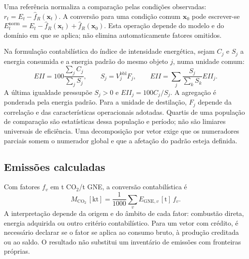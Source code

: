 Uma referência normaliza a comparação pelas condições observadas: $r_t=E_t-\widehat f_R(\boldsymbol x_t)$. A conversão para uma condição comum $\boldsymbol x_0$ pode escrever-se $E_t^{\mathrm{norm}}=E_t-\widehat f_R(\boldsymbol x_t)+\widehat f_R(\boldsymbol x_0)$. Esta operação depende do modelo e do domínio em que se aplica; não elimina automaticamente fatores omitidos.

Na formulação contabilística do índice de intensidade energética, sejam $C_j$ e $S_j$ a energia consumida e a energia padrão do mesmo objeto $j$, numa unidade comum:
\begin{equation}
EII=100\frac{\sum_jC_j}{\sum_jS_j},
\qquad S_j=V_j^{\mathrm{bbl}}F_j,
\qquad EII=\sum_j\frac{S_j}{\sum_kS_k}EII_j.
\label{eq:mat-eii}
\end{equation}
A última igualdade pressupõe $S_j>0$ e $EII_j=100C_j/S_j$. A agregação é ponderada pela energia padrão. Para a unidade de destilação, $F_j$ depende da correlação e das características operacionais adotadas. Quartis de uma população de comparação são estatísticas dessa população e período; não são limiares universais de eficiência. Uma decomposição por vetor exige que os numeradores parciais somem o numerador global e que a afetação do padrão esteja definida.


\subsection{Emissões calculadas}
\label{sec:mat-emissoes}
Com fatores $f_v$ em t CO$_2$/t GNE, a
conversão contabilística é
\begin{equation}
M_{\mathrm{CO_2}}\,[\mathrm{kt}]=\frac1{1000}\sum_v E_{\mathrm{GNE},v}\,[\mathrm{t}]\,f_v.
\label{eq:mat-emissoes}
\end{equation}
A interpretação depende da origem e do âmbito de cada fator: combustão direta, energia adquirida ou outro critério contabilístico. Para um vetor com crédito, é necessário declarar se o fator se aplica ao consumo bruto, à produção creditada ou ao saldo. O resultado não substitui um inventário de emissões com fronteiras próprias.

